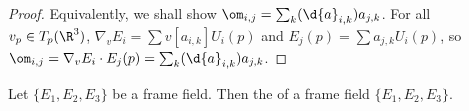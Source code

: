 \documentclass[10pt]{article}
\begin{document}
\begin{proof}
    Equivalently, we shall show ${\om}_{i,j}={\sum}_{k}(\d{a}_{i,k}){a}_{j,k}$. For all ${v}_{p}\in{T}_{p}({\R}^{3})$, ${\nabla}_{v}{E}_{i}=\sum v[{a}_{i,k}]{U}_{i}(p)$ and ${E}_{j}(p)=\sum{a}_{j,k}{U}_{i}(p)$, so ${\om}_{i,j}={\nabla}_{v}{E}_{i}\cdot{E}_{j}(p)={\sum}_{k}(\d{a}_{i,k}){a}_{j,k}$.
\end{proof}
\begin{definition}
    Let $\{{E}_{1},{E}_{2},{E}_{3}\}$ be a frame field. Then the  of a frame field $\{{E}_{1},{E}_{2},{E}_{3}\}$.
\end{definition}

\hindex
\end{document}
